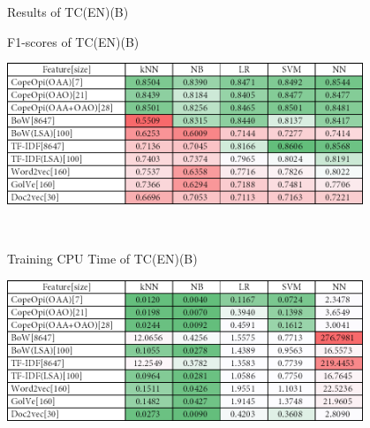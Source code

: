 \caption{Results of TC(EN)(B)}
\label{tab:tc_en_b}
\centering
\begin{subtable}{\textwidth}
	\centering
	\caption{F1-scores of TC(EN)(B)}
	\includegraphics[width=0.8\textwidth]{./figure/01B2.png}
\end{subtable}\\[1em]
\begin{subtable}{\textwidth}
	\centering
	\caption{Training CPU Time of TC(EN)(B)}
	\includegraphics[width=0.8\textwidth]{./figure/01B2t.png}
\end{subtable}
